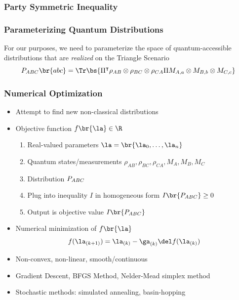 \documentclass[
    hyperref={bookmarks=false},%
    xcolor={dvipsnames},
]{beamer}
\begin{document}
\begin{frame}[shrink=60]
    \frametitle{Party Symmetric Inequality}
    
\end{frame}


\begin{frame}
    \frametitle{Parameterizing Quantum Distributions}
    For our purposes, we need to parameterize the space of quantum-accessible distributions that are \textit{realized} on the Triangle Scenario
    \[ \prob[ABC]\br{abc} = \Tr\bs{\netperm^\intercal \rho_{AB}\otimes\rho_{BC}\otimes\rho_{CA} \netperm M_{A,a}\otimes M_{B,b} \otimes M_{C,c}} \]
    \begin{center}
        \scalebox{1.0}{}
    \end{center}
\end{frame}

\begin{frame}
    \frametitle{Numerical Optimization}
    \begin{itemize}
        \item Attempt to find new non-classical distributions
        \item Objective function $f\br{\la} \in \R$
        \begin{enumerate}
            \item Real-valued parameters $\la = \br{\la_0, \ldots, \la_n}$
            \item Quantum states/measurements $\rho_{AB}, \rho_{BC}, \rho_{CA}, M_{A}, M_{B}, M_{C}$
            \item Distribution $\prob[ABC]$
            \item Plug into inequality $I$ in homogeneous form $I\br{\prob[ABC]} \geq 0$
            \item Output is objective value $I\br{\prob[ABC]}$
        \end{enumerate}
        \item Numerical minimization of $f\br{\la}$
        \[ f(\la_{(k+1)}) = \la_{(k)} - \ga_{(k)} \del f(\la_{(k)})  \]
        \item Non-convex, non-linear, smooth/continuous
        \item Gradient Descent, BFGS Method, Nelder-Mead simplex method
        \item Stochastic methods: simulated annealing, basin-hopping
    \end{itemize}
\end{frame}
\end{document}
